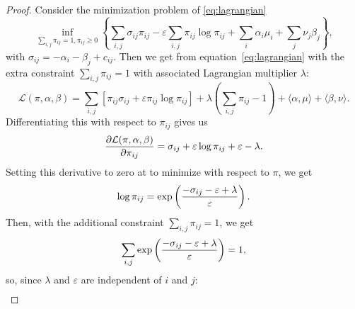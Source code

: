 \begin{proof} 
	Consider the minimization problem of \eqref{eq:lagrangian}
	\begin{equation*}
		\inf_{\sum_{i,j} \pi_{ij} = 1, \pi_{ij}\geq 0} \left\{ \sum_{i,j} \sigma_{ij}\pi_{ij} - \varepsilon \sum_{i,j} \pi_{ij} \log \pi_{ij} + \sum_i \alpha_i \mu_i + \sum_j \nu_j \beta_j \right\},
	\end{equation*}
	with $\sigma_{ij} = -\alpha_i -\beta_j + c_{ij}$. Then we get from equation~\eqref{eq:lagrangian} with the extra constraint $\sum_{i,j} \pi_{ij}= 1$ with associated Lagrangian multiplier $\lambda$: 
	\begin{equation*}
		\mathcal{L} (\pi, \alpha, \beta) = \sum_{i,j} \left[\pi_{ij} \sigma_{ij} + \varepsilon \pi_{ij} \log \pi_{ij}\right] + \lambda\left(\sum_{i,j} \pi_{ij} - 1\right) + \langle \alpha, \mu\rangle + \langle \beta, \nu \rangle. 
	\end{equation*}
	Differentiating this with respect to $\pi_{ij}$ gives us 
	\begin{equation*}
		\frac{\partial \mathcal{L}(\pi, \alpha, \beta)}{\partial \pi_{ij}} = \sigma_{ij} + \varepsilon \log \pi_{ij} + \varepsilon - \lambda. 
	\end{equation*}
	Setting this derivative to zero at to minimize with respect to $\pi$, we get 
	\begin{equation}
		 \log \pi_{ij} =\exp\left( \frac{-\sigma_{ij} - \varepsilon + \lambda}{\varepsilon}\right).
		 \label{eq:logpi}
	\end{equation}
	Then, with the additional constraint $\sum_{i,j} \pi_{ij}= 1$, we get 
	\begin{equation*}
		\sum_{i,j} \exp\left( \frac{-\sigma_{ij} - \varepsilon + \lambda}{\varepsilon}\right) = 1,
	\end{equation*}
	so, since $\lambda$ and $\varepsilon$ are independent of $i$ and $j$:
	\begin{align*}

\end{align*}
\end{proof}
